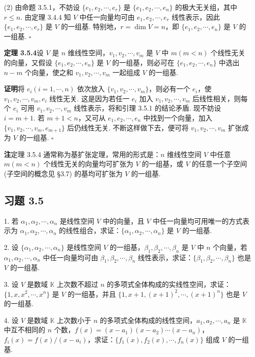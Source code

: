 \documentclass[UTF8,12pt,a4paper,fontset=fandol]{ctexart}
\begin{document}
(2) 由命题 3.5.1，不妨设 $\{e_1,e_2,\cdots,e_r\}$ 是 $\{e_1,e_2,\cdots,e_n\}$ 的极大无关组，其中 $r\leq n$. 由定理 3.4.4 知 $V$ 中任一向量均可由 $e_1,e_2,\cdots,e_r$ 线性表示，因此 $\{e_1,e_2,\cdots,e_r\}$ 是 $V$ 的一组基. 特别地，$r=\dim V=n$，即 $\{e_1,e_2,\cdots,e_n\}$ 是 $V$ 的一组基. $\square$

\noindent\textbf{定理 3.5.4}\quad 设 $V$ 是 $n$ 维线性空间，$v_1,v_2,\cdots,v_m$ 是 $V$ 中 $m(m<n)$ 个线性无关的向量，又假设 $\{e_1,e_2,\cdots,e_n\}$ 是 $V$ 的一组基，则必可在 $\{e_1,e_2,\cdots,e_n\}$ 中选出 $n-m$ 个向量，使之和 $v_1,v_2,\cdots,v_m$ 一起组成 $V$ 的一组基.

\noindent\textbf{证明}\quad 将 $e_i(i=1,\cdots,n)$ 依次放入 $\{v_1,v_2,\cdots,v_m\}$，则必有一个 $e_i$，使 $v_1,v_2,\cdots,v_m,e_i$ 线性无关. 这是因为若任一 $e_i$ 加入 $v_1,v_2,\cdots,v_m$ 后线性相关，则每个 $e_i$ 可用 $v_1,v_2,\cdots,v_m$ 线性表示，将和引理 3.5.1 的结论矛盾. 现不妨设 $i=m+1$. 若 $m+1<n$，又可从 $e_1,e_2,\cdots,e_n$ 中找到一个向量，加入 $\{v_1,v_2,\cdots,v_m,e_{m+1}\}$ 后仍线性无关. 不断这样做下去，便可将 $v_1,v_2,\cdots,v_m$ 扩张成为 $V$ 的一组基. $\square$

\noindent\textbf{注}\quad 定理 3.5.4 通常称为基扩张定理，常用的形式是：$n$ 维线性空间 $V$ 中任意 $m(m<n)$ 个线性无关的向量均可扩张为 $V$ 的一组基，或 $V$ 的任意一个子空间 (子空间的概念见 §3.7) 的基均可扩张为 $V$ 的一组基.

\subsection*{习题 3.5}

1. 若 $\alpha_1,\alpha_2,\cdots,\alpha_n$ 是线性空间 $V$ 中的向量，且 $V$ 中任一向量均可用唯一的方式表示为 $\alpha_1,\alpha_2,\cdots,\alpha_n$ 的线性组合，求证：$\{\alpha_1,\alpha_2,\cdots,\alpha_n\}$ 是 $V$ 的一组基.

2. 设 $\{\alpha_1,\alpha_2,\cdots,\alpha_n\}$ 是线性空间 $V$ 的一组基，$\beta_1,\beta_2,\cdots,\beta_n$ 是 $V$ 中 $n$ 个向量，若 $\alpha_1,\alpha_2,\cdots,\alpha_n$ 中任一向量均可由 $\beta_1,\beta_2,\cdots,\beta_n$ 线性表示，求证：$\{\beta_1,\beta_2,\cdots,\beta_n\}$ 也是 $V$ 的一组基.

3. 设 $V$ 是数域 $\mathbb{K}$ 上次数不超过 $n$ 的多项式全体构成的实线性空间，求证：$\{1,x,x^2,\cdots,x^n\}$ 是 $V$ 的一组基，并且 $\{1,x+1,(x+1)^2,\cdots,(x+1)^n\}$ 也是 $V$ 的一组基.

4. 设 $V$ 是数域 $\mathbb{K}$ 上次数小于 $n$ 的多项式全体构成的线性空间，$a_1,a_2,\cdots,a_n$ 是 $\mathbb{K}$ 中互不相同的 $n$ 个数，$f(x)=(x-a_1)(x-a_2)\cdots(x-a_n)$，$f_i(x)=f(x)/(x-a_i)$，求证：$\{f_1(x),f_2(x),\cdots,f_n(x)\}$ 组成 $V$ 的一组基.
\end{document}
